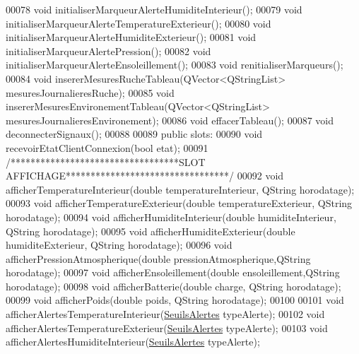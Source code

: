 \begin{DoxyCode}
00078     \textcolor{keywordtype}{void} initialiserMarqueurAlerteHumiditeInterieur();
00079     \textcolor{keywordtype}{void} initialiserMarqueurAlerteTemperatureExterieur();
00080     \textcolor{keywordtype}{void} initialiserMarqueurAlerteHumiditeExterieur();
00081     \textcolor{keywordtype}{void} initialiserMarqueurAlertePression();
00082     \textcolor{keywordtype}{void} initialiserMarqueurAlerteEnsoleillement();
00083     \textcolor{keywordtype}{void} renitialiserMarqueurs();
00084     \textcolor{keywordtype}{void} insererMesuresRucheTableau(QVector<QStringList> mesuresJournalieresRuche);
00085     \textcolor{keywordtype}{void} insererMesuresEnvironementTableau(QVector<QStringList> mesuresJournalieresEnvironement);
00086     \textcolor{keywordtype}{void} effacerTableau();
00087     \textcolor{keywordtype}{void} deconnecterSignaux();
00088 
00089 \textcolor{keyword}{public} slots:
00090     \textcolor{keywordtype}{void} recevoirEtatClientConnexion(\textcolor{keywordtype}{bool} etat);
00091     \textcolor{comment}{/**********************************SLOT AFFICHAGE*********************************/}
00092     \textcolor{keywordtype}{void} afficherTemperatureInterieur(\textcolor{keywordtype}{double} temperatureInterieur, QString horodatage);
00093     \textcolor{keywordtype}{void} afficherTemperatureExterieur(\textcolor{keywordtype}{double} temperatureExterieur, QString horodatage);
00094     \textcolor{keywordtype}{void} afficherHumiditeInterieur(\textcolor{keywordtype}{double} humiditeInterieur, QString horodatage);
00095     \textcolor{keywordtype}{void} afficherHumiditeExterieur(\textcolor{keywordtype}{double} humiditeExterieur, QString horodatage);
00096     \textcolor{keywordtype}{void} afficherPressionAtmospherique(\textcolor{keywordtype}{double} pressionAtmospherique,QString horodatage);
00097     \textcolor{keywordtype}{void} afficherEnsoleillement(\textcolor{keywordtype}{double} ensoleillement,QString horodatage);
00098     \textcolor{keywordtype}{void} afficherBatterie(\textcolor{keywordtype}{double} charge, QString horodatage);
00099     \textcolor{keywordtype}{void} afficherPoids(\textcolor{keywordtype}{double} poids, QString horodatage);
00100 
00101     \textcolor{keywordtype}{void} afficherAlertesTemperatureInterieur(\hyperlink{parametres_8h_aaa6de8207c94675264c90b10b613368d}{SeuilsAlertes} typeAlerte);
00102     \textcolor{keywordtype}{void} afficherAlertesTemperatureExterieur(\hyperlink{parametres_8h_aaa6de8207c94675264c90b10b613368d}{SeuilsAlertes} typeAlerte);
00103     \textcolor{keywordtype}{void} afficherAlertesHumiditeInterieur(\hyperlink{parametres_8h_aaa6de8207c94675264c90b10b613368d}{SeuilsAlertes} typeAlerte);

\end{DoxyCode}
